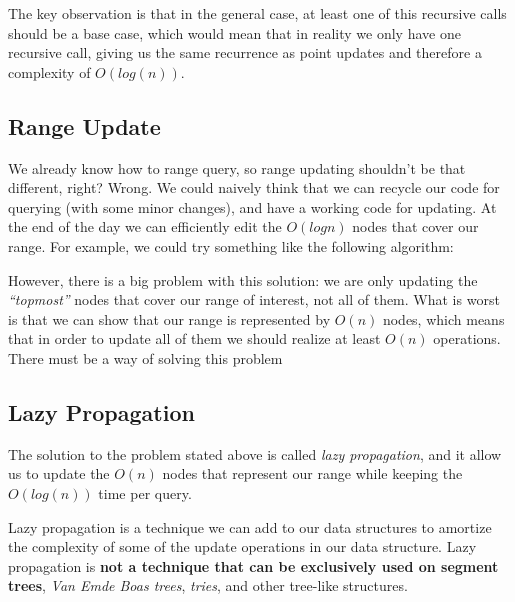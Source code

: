 \documentclass{article}
\begin{document}
The key observation is that in the general case, at least one of this recursive calls should be a base case, which would mean that in reality we only have one recursive call, giving us the same recurrence as point updates and therefore a complexity of $O(log(n))$.


\subsection{Range Update}

We already know how to range query, so range updating shouldn't be that different, right? Wrong. We could naively think that we can recycle our code for querying (with some minor changes), and have a working code for updating. At the end of the day we can efficiently edit the $O(logn)$ nodes that cover our range. For example, we could try something like the following algorithm:

\begin{algorithm}[H]
	\SetAlgoNoLine
	\SetAlgoNoEnd
\end{algorithm}

However, there is a big problem with this solution: we are only updating the \textit{``topmost''} nodes that cover our range of interest, not all of them. What is worst is that we can show that our range is represented by $O(n)$ nodes, which means that in order to update all of them we should realize at least $O(n)$ operations. There must be a way of solving this problem

\subsection{Lazy Propagation}

The solution to the problem stated above is called \textit{lazy propagation}, and it allow us to update the $O(n)$ nodes that represent our range while keeping the $O(log(n))$ time per query.

Lazy propagation is a technique we can add to our data structures to amortize the complexity of some of the update operations in our data structure. Lazy propagation is \textbf{not a technique that can be exclusively used on segment trees}, \textit{Van Emde Boas trees}, \textit{tries}, and other tree-like structures.
\end{document}
